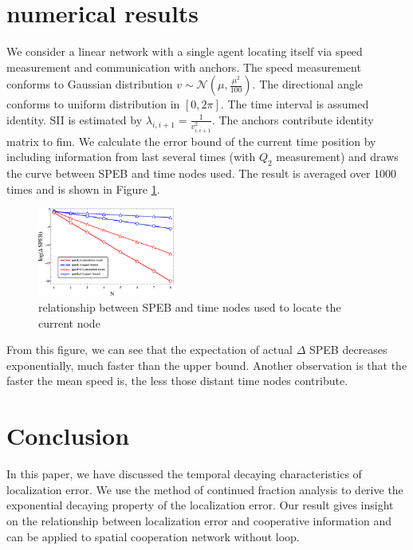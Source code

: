 \documentclass[conference]{IEEEtran}
\begin{document}
\section{numerical results}\label{numerical}
We consider a linear network with a single agent locating itself via speed measurement and communication with anchors. 
The speed measurement conforms to Gaussian distribution $v \sim \mathcal{N}(\mu,\frac{\mu^2}{100})$. 
The directional angle conforms to uniform distribution in $[0,2\pi]$. The time interval is assumed identity. 
SII is estimated by $\lambda_{i,i+1}=\frac{1}{v_{i,i+1}^2}$. The anchors contribute identity matrix to \ac{fim}. 
We calculate the error bound of the current time position by including information from last several times (with $Q_2$ measurement) 
and draws the curve between SPEB and time nodes used. The result is averaged over 1000 times and is shown in Figure \ref{FF2}.
\begin{figure}[!t]
\centering
\includegraphics[width=0.4\textwidth]{decreasing_exponential.eps}
\caption{relationship between SPEB and time nodes used to locate the current node}\label{FF2}
\end{figure}

From this figure, we can see that the expectation of actual $\Delta$ SPEB decreases exponentially, much faster than the upper bound.
Another observation is that the faster the mean speed is, the less those distant time nodes contribute.
\section{Conclusion}
In this paper, we have discussed the temporal decaying characteristics of localization error. 
We use the method of continued fraction analysis to derive the exponential decaying property of the localization error. 
Our result gives insight on the relationship between localization error and cooperative information 
and can be applied to spatial  cooperation network without loop.
\end{document}
